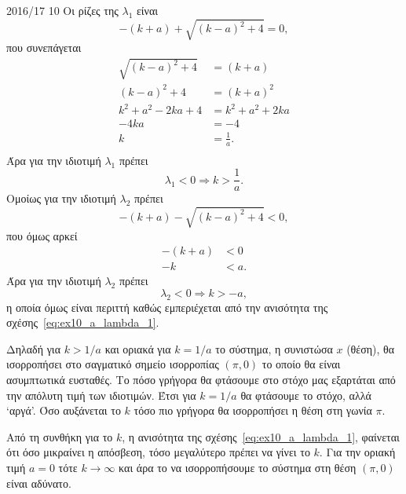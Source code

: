 \begin{solution}{2016/17 10}
    Οι ρίζες της \( \lambda_1 \) είναι
    \[
        -(k + a) + \sqrt{(k -a)^2 + 4} = 0,
    \]
    που συνεπάγεται
    \begin{align*}
         \sqrt{(k -a)^2 + 4} &= (k + a) \\
         (k -a)^2 + 4 &= (k + a)^2 \\
         k^2 + a^2 -2ka + 4 &= k^2 + a^2 + 2ka \\
         -4ka &= -4 \\
         k &= \frac{1}{a}. \\
    \end{align*}
    Άρα για την ιδιοτιμή \( \lambda_1 \) πρέπει
    \begin{equation}\label{eq:ex10_a_lambda_1}
        \lambda_1 < 0 \Rightarrow k > \frac{1}{a}.
    \end{equation}
    Ομοίως για την ιδιοτιμή \( \lambda_2 \) πρέπει
    \[
        -(k + a) - \sqrt{(k -a)^2 + 4} < 0,
    \]
    που όμως αρκεί
    \begin{align*}
        -(k + a) &< 0 \\
        -k &< a.
    \end{align*}
    Άρα για την ιδιοτιμή \( \lambda_2 \) πρέπει
    \[
        \lambda_2 < 0 \Rightarrow k > -a,
    \]
    η οποία όμως είναι περιττή καθώς εμπεριέχεται από την ανισότητα της
    σχέσης~\eqref{eq:ex10_a_lambda_1}.

    Δηλαδή για \( k > 1/a \) και οριακά για \( k = 1/a \) το σύστημα, η
    συνιστώσα \( x \) (θέση), θα ισορροπήσει στο σαγματικό σημείο ισορροπίας
    \( (\pi, 0) \) το οποίο θα είναι ασυμπτωτικά ευσταθές. Το πόσο γρήγορα θα
    φτάσουμε στο στόχο μας εξαρτάται από την απόλυτη τιμή των ιδιοτιμών. Έτσι
    για \( k = 1/a \) θα φτάσουμε το στόχο, αλλά \enquote*{αργά}. Όσο αυξάνεται
    το \( k \) τόσο πιο γρήγορα θα ισορροπήσει η θέση στη γωνία \( \pi \).

    Από τη συνθήκη για το \( k \), η ανισότητα της
    σχέσης~\eqref{eq:ex10_a_lambda_1}, φαίνεται ότι όσο μικραίνει η απόσβεση,
    τόσο μεγαλύτερο πρέπει να γίνει το \( k \). Για την οριακή τιμή \( a = 0 \)
    τότε \( k \to \infty \) και άρα το να ισορροπήσουμε το σύστημα στη θέση \(
    (\pi, 0) \) είναι αδύνατο.


\end{solution}
